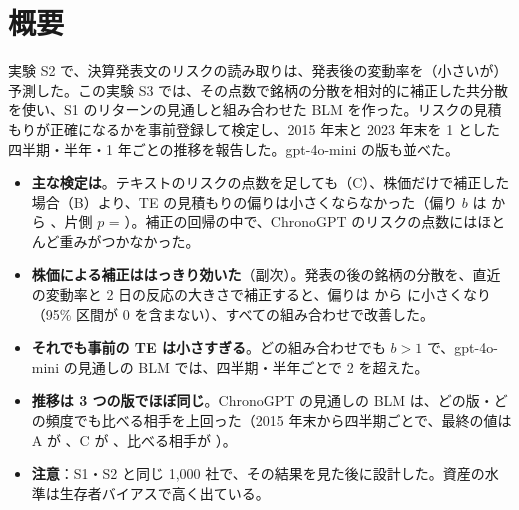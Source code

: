 \chapter*{概要}

実験 S2 で、決算発表文のリスクの読み取りは、発表後の変動率を（小さいが）予測した。この実験 S3 では、その点数で銘柄の分散を相対的に補正した共分散を使い、S1 のリターンの見通しと組み合わせた BLM を作った。リスクの見積もりが正確になるかを事前登録して検定し、2015 年末と 2023 年末を 1 とした四半期・半年・1 年ごとの推移を報告した。gpt-4o-mini の版も並べた。

\begin{keybox}[要点]
\begin{itemize}
\item \textbf{主な検定は}。テキストのリスクの点数を足しても（C）、株価だけで補正した場合（B）より、TE の見積もりの偏りは小さくならなかった（偏り $b$ は  から 、片側 $p$ = ）。補正の回帰の中で、ChronoGPT のリスクの点数にはほとんど重みがつかなかった。
\item \textbf{株価による補正ははっきり効いた}（副次）。発表の後の銘柄の分散を、直近の変動率と 2 日の反応の大きさで補正すると、偏りは  から  に小さくなり（95\% 区間が 0 を含まない）、すべての組み合わせで改善した。
\item \textbf{それでも事前の TE は小さすぎる}。どの組み合わせでも $b > 1$ で、gpt-4o-mini の見通しの BLM では、四半期・半年ごとで 2 を超えた。
\item \textbf{推移は 3 つの版でほぼ同じ}。ChronoGPT の見通しの BLM は、どの版・どの頻度でも比べる相手を上回った（2015 年末から四半期ごとで、最終の値は A が 、C が 、比べる相手が ）。
\item \textbf{注意}：S1・S2 と同じ 1,000 社で、その結果を見た後に設計した。資産の水準は生存者バイアスで高く出ている。
\end{itemize}
\end{keybox}
